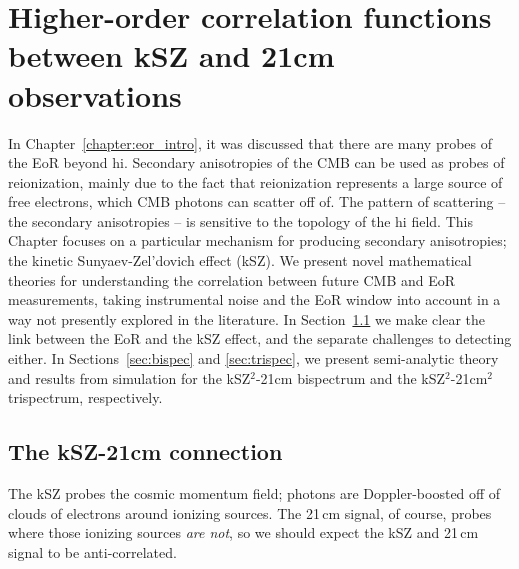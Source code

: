 \chapter{Higher-order correlation functions between kSZ and 21cm observations}
\label{chapter:ksz_21cm}

In Chapter~\ref{chapter:eor_intro}, it was discussed that there are many probes of the EoR beyond {\sc hi}. Secondary anisotropies of the CMB can be used as probes of reionization, mainly due to the fact that reionization represents a large source of free electrons, which CMB photons can scatter off of. The pattern of scattering -- the secondary anisotropies -- is sensitive to the topology of the {\sc hi} field. This Chapter focuses on a particular mechanism for producing secondary anisotropies; the kinetic Sunyaev-Zel'dovich effect (kSZ). We present novel mathematical theories for understanding the correlation between future CMB and EoR measurements, taking instrumental noise and the EoR window into account in a way not presently explored in the literature. In Section~\ref{sec:ksz-21cm} we make clear the link between the EoR and the kSZ effect, and the separate challenges to detecting either. In Sections~\ref{sec:bispec} and \ref{sec:trispec}, we present semi-analytic theory and results from simulation for the kSZ$^2$-21cm bispectrum and the kSZ$^2$-21cm$^2$ trispectrum, respectively.

\section{The kSZ-21cm connection}
\label{sec:ksz-21cm}

The kSZ probes the cosmic momentum field; photons are Doppler-boosted off of clouds of electrons around ionizing sources. The 21\,cm signal, of course, probes where those ionizing sources \textit{are not}, so we should expect the kSZ and 21\,cm signal to be anti-correlated. 

